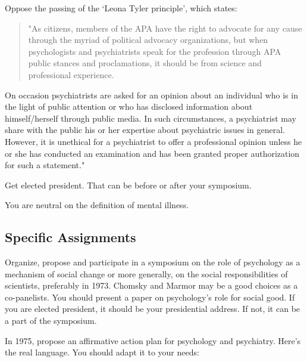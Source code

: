 \begin{refsection}
Oppose the passing of the `Leona Tyler principle', which states:

\begin{quote}

"As citizens, members of the APA have the right to advocate for any cause through the myriad of political advocacy organizations, but when psychologists and psychiatrists speak for the profession through APA public stances and proclamations, it should be from science and professional experience. 
\end{quote}

On occasion psychiatrists are asked for an opinion about an individual who is in the light of public attention or who has disclosed information about himself\slash herself through public media. In such circumstances, a psychiatrist may share with the public his or her expertise about psychiatric issues in general. However, it is unethical for a psychiatrist to offer a professional opinion unless he or she has conducted an examination and has been granted proper authorization for such a statement."

Get elected president. That can be before or after your symposium.

You are neutral on the definition of mental illness. 

\subsection{Specific Assignments}
\label{specificassignments}

Organize, propose and participate in a symposium on the role of psychology as a mechanism of social change or more generally, on the social responsibilities of scientists, preferably in 1973. Chomsky and Marmor may be a good choices as a co-panelists. You should present a paper on psychology's role for social good. If you are elected president, it should be your presidential address. If not, it can be a part of the symposium.

In 1975, propose an affirmative action plan for psychology and psychiatry. Here's the real language. You should adapt it to your needs:

\begin{quote}


\end{quote}
\end{refsection}
